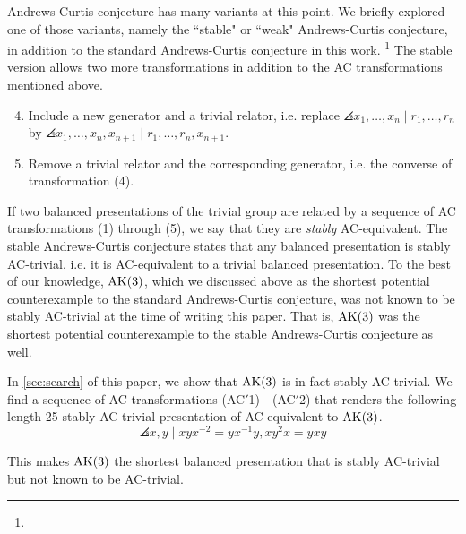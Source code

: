 Andrews-Curtis conjecture has many variants at this point. We briefly explored one of those variants, namely the ``stable" or ``weak" Andrews-Curtis conjecture, in addition to the standard Andrews-Curtis conjecture in this work. 
\footnote{}
The stable version allows two more transformations in addition to the AC transformations mentioned above. 

\begin{enumerate}[label=(AC\arabic*)]
	\setcounter{enumi}{3}
	\item Include a new generator and a trivial relator, i.e. replace $\angles{x_1, \dots, x_n \mid r_1, \dots, r_n}$ by $\angles{x_1, \dots, x_n, x_{n+1} \mid r_1, \dots, r_n, x_{n+1}}$.
	\item Remove a trivial relator and the corresponding generator, i.e. the converse of transformation (4). 
\end{enumerate}

If two balanced presentations of the trivial group are related by a sequence of AC transformations (1) through (5), we say that they are \textit{stably} AC-equivalent. The stable Andrews-Curtis conjecture states that any balanced presentation is stably AC-trivial, i.e. it is AC-equivalent to a trivial balanced presentation. To the best of our knowledge, $\text{AK}(3)$, which we discussed above as the shortest potential counterexample to the standard Andrews-Curtis conjecture, was not known to be stably AC-trivial at the time of writing this paper. That is, $\text{AK}(3)$ was the shortest potential counterexample to the stable Andrews-Curtis conjecture as well.
\newline 

In \autoref{sec:search} of this paper, we show that $\text{AK}(3)$ is in fact stably AC-trivial. We find a sequence of AC transformations (AC$'$1) - (AC$'$2) that renders the following length 25 stably AC-trivial presentation of \cite{MMS} AC-equivalent to $\text{AK}(3)$.
\[
\angles{x, y \mid x y x^{-2} = y x^{-1} y, xy^2 x = y x y}
\]

This makes $\text{AK}(3)$ the shortest balanced presentation that is stably AC-trivial but not known to be AC-trivial.
 
